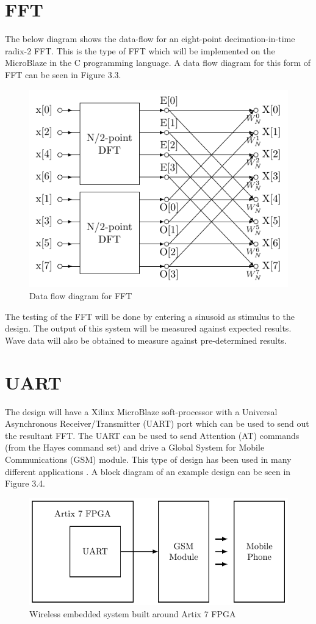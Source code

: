 \documentclass[12pt,a4paper]{report} %
\begin{document}
\section{FFT}
The below diagram shows the data-flow for an eight-point decimation-in-time radix-2 FFT.
This is the type of FFT which will be implemented on the MicroBlaze in the C programming language.
A data flow diagram for this form of FFT can be seen in Figure 3.3.
\begin{figure}[h]
\centerline{\includegraphics[scale=0.8]{diagrams/FFT}}
\caption{Data flow diagram for FFT}
\end{figure}

The testing of the FFT will be done by entering a sinusoid as stimulus to the design.
The output of this system will be measured against expected results.
Wave data will also be obtained to measure against pre-determined results.
\section{UART}
The design will have a Xilinx MicroBlaze soft-processor with a Universal Asynchronous Receiver/Transmitter (UART) port which can be used to send out the resultant FFT.
The UART can be used to send Attention (AT) commands (from the Hayes command set) and drive a Global System for Mobile Communications (GSM) module.
This type of design has been used in many different applications \cite{Gai13,Jos16}.
A block diagram of an example design can be seen in Figure 3.4.
\begin{figure}[h]
\centerline{\includegraphics[scale=0.8]{diagrams/GSM}}
\caption{Wireless embedded system built around Artix 7 FPGA}
\end{figure}
\end{document}
